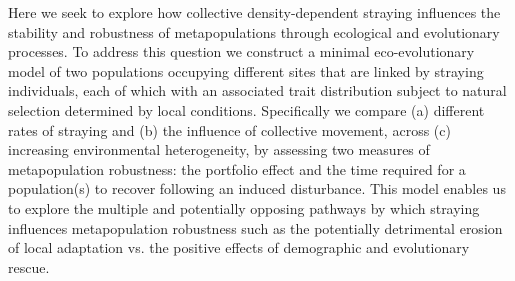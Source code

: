 \documentclass{revtex4}
\begin{document}

% 

Here we seek to explore how collective density-dependent straying influences the stability and robustness of metapopulations through ecological and evolutionary processes.
To address this question we construct a minimal eco-evolutionary model of two populations occupying different sites that are linked by straying individuals, each of which with an associated trait distribution subject to natural selection determined by local conditions.
Specifically we compare (a) different rates of straying and (b) the influence of collective movement, across (c) increasing environmental heterogeneity, by assessing two measures of metapopulation robustness: the portfolio effect and the time required for a population(s) to recover following an induced disturbance. 
This model enables us to explore the multiple and potentially opposing pathways by which straying influences metapopulation robustness such as the potentially detrimental erosion of local adaptation vs. the positive effects of demographic and evolutionary rescue.
\end{document}
